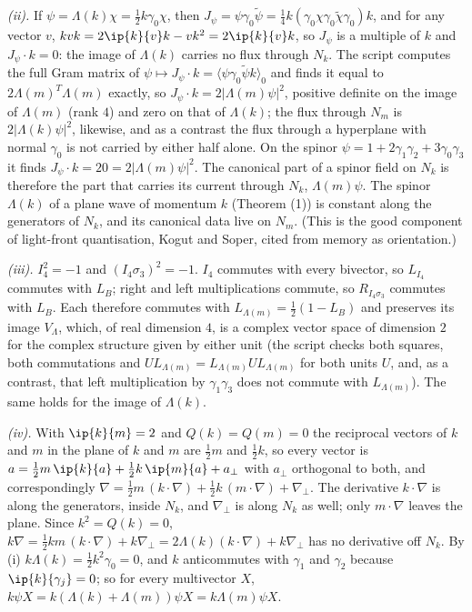 \emph{(ii).} If $\psi = \Lambda(k)\chi = \tfrac12 k\gamma_{0}\chi$, then $J_{\psi} = \psi\gamma_{0}\tilde{\psi} = \tfrac14 k(\gamma_{0}\chi\gamma_{0}\tilde{\chi}\gamma_{0})k$, and for any vector $v$, $kvk = 2\ip{k}{v}k - vk^{2} = 2\ip{k}{v}k$, so $J_{\psi}$ is a multiple of $k$ and $J_{\psi}\cdot k = 0$: the image of $\Lambda(k)$ carries no flux through $N_{k}$. The script computes the full Gram matrix of $\psi \mapsto J_{\psi}\cdot k = \langle\psi\gamma_{0}\tilde{\psi}k\rangle_{0}$ and finds it equal to $2\Lambda(m)^{T}\Lambda(m)$ exactly, so $J_{\psi}\cdot k = 2|\Lambda(m)\psi|^{2}$, positive definite on the image of $\Lambda(m)$ (rank $4$) and zero on that of $\Lambda(k)$; the flux through $N_{m}$ is $2|\Lambda(k)\psi|^{2}$, likewise, and as a contrast the flux through a hyperplane with normal $\gamma_{0}$ is not carried by either half alone. On the spinor $\psi = 1 + 2\gamma_{1}\gamma_{2} + 3\gamma_{0}\gamma_{3}$ it finds $J_{\psi}\cdot k = 20 = 2|\Lambda(m)\psi|^{2}$. The canonical part of a spinor field on $N_{k}$ is therefore the part that carries its current through $N_{k}$, $\Lambda(m)\psi$. The spinor $\Lambda(k)$ of a plane wave of momentum $k$ (Theorem (1)) is constant along the generators of $N_{k}$, and its canonical data live on $N_{m}$. (This is the good component of light-front quantisation, Kogut and Soper, cited from memory as orientation.)

\emph{(iii).} $I_{4}^{2} = -1$ and $(I_{4}\sigma_{3})^{2} = -1$. $I_{4}$ commutes with every bivector, so $L_{I_{4}}$ commutes with $L_{B}$; right and left multiplications commute, so $R_{I_{4}\sigma_{3}}$ commutes with $L_{B}$. Each therefore commutes with $L_{\Lambda(m)} = \tfrac12(1 - L_{B})$ and preserves its image $V_{\Lambda}$, which, of real dimension $4$, is a complex vector space of dimension $2$ for the complex structure given by either unit (the script checks both squares, both commutations and $U L_{\Lambda(m)} = L_{\Lambda(m)} U L_{\Lambda(m)}$ for both units $U$, and, as a contrast, that left multiplication by $\gamma_{1}\gamma_{3}$ does not commute with $L_{\Lambda(m)}$). The same holds for the image of $\Lambda(k)$.

\emph{(iv).} With $\ip{k}{m} = 2$ and $Q(k) = Q(m) = 0$ the reciprocal vectors of $k$ and $m$ in the plane of $k$ and $m$ are $\tfrac12 m$ and $\tfrac12 k$, so every vector is $a = \tfrac12 m\,\ip{k}{a} + \tfrac12 k\,\ip{m}{a} + a_{\perp}$ with $a_{\perp}$ orthogonal to both, and correspondingly $\nabla = \tfrac12 m\,(k\cdot\nabla) + \tfrac12 k\,(m\cdot\nabla) + \nabla_{\perp}$. The derivative $k\cdot\nabla$ is along the generators, inside $N_{k}$, and $\nabla_{\perp}$ is along $N_{k}$ as well; only $m\cdot\nabla$ leaves the plane. Since $k^{2} = Q(k) = 0$, $k\nabla = \tfrac12 km\,(k\cdot\nabla) + k\nabla_{\perp} = 2\Lambda(k)(k\cdot\nabla) + k\nabla_{\perp}$ has no derivative off $N_{k}$. By (i) $k\Lambda(k) = \tfrac12 k^{2}\gamma_{0} = 0$, and $k$ anticommutes with $\gamma_{1}$ and $\gamma_{2}$ because $\ip{k}{\gamma_{j}} = 0$; so for every multivector $X$, $k\psi X = k(\Lambda(k) + \Lambda(m))\psi X = k\Lambda(m)\psi X$.

